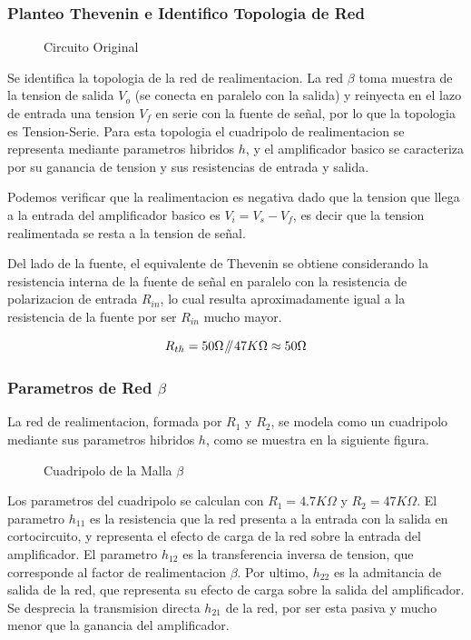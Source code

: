 \documentclass[11pt,a4paper]{article}
\newcommand{\parallelsum}{\mathbin{\!/\mkern-5mu/\!}}
\begin{document}
\subsubsection{Planteo Thevenin e Identifico Topologia de Red}

\begin{figure}[!h]
    \centering
    
    \caption{Circuito Original}
\end{figure}

Se identifica la topologia de la red de realimentacion. La red \(\beta\) toma muestra de la tension de salida \(V_o\) (se conecta en paralelo con la salida) y reinyecta en el lazo de entrada una tension \(V_f\) en serie con la fuente de señal, por lo que la topologia es Tension-Serie. Para esta topologia el cuadripolo de realimentacion se representa mediante parametros hibridos \(h\), y el amplificador basico se caracteriza por su ganancia de tension y sus resistencias de entrada y salida.

Podemos verificar que la realimentacion es negativa dado que la tension que llega a la entrada del amplificador basico es \( V_i = V_s - V_f \), es decir que la tension realimentada se resta a la tension de señal.

Del lado de la fuente, el equivalente de Thevenin se obtiene considerando la resistencia interna de la fuente de señal en paralelo con la resistencia de polarizacion de entrada \(R_{in}\), lo cual resulta aproximadamente igual a la resistencia de la fuente por ser \(R_{in}\) mucho mayor.

\begin{equation}
{R_{th}} = 50 \Omega \parallelsum 47K\Omega \approx 50 \Omega
\end{equation}

\subsubsection{\texorpdfstring{Parametros de  Red \(\beta\)}{Parametros de Red }}

La red de realimentacion, formada por \(R_1\) y \(R_2\), se modela como un cuadripolo mediante sus parametros hibridos \(h\), como se muestra en la siguiente figura.

\begin{figure}[h!]
    \centering
    
    \caption{Cuadripolo de la Malla \(\beta\)}
\end{figure}

Los parametros del cuadripolo se calculan con \(R_1 = 4.7K\Omega\) y \(R_2 = 47K\Omega\). El parametro \(h_{11}\) es la resistencia que la red presenta a la entrada con la salida en cortocircuito, y representa el efecto de carga de la red sobre la entrada del amplificador. El parametro \(h_{12}\) es la transferencia inversa de tension, que corresponde al factor de realimentacion \(\beta\). Por ultimo, \(h_{22}\) es la admitancia de salida de la red, que representa su efecto de carga sobre la salida del amplificador. Se desprecia la transmision directa \(h_{21}\) de la red, por ser esta pasiva y mucho menor que la ganancia del amplificador.
\end{document}
